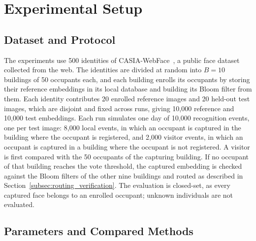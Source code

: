 \documentclass[pdflatex,sn-mathphys-num]{sn-jnl}%
\theoremstyle{thmstyleone}%
\theoremstyle{thmstyletwo}%
\theoremstyle{thmstylethree}%
\begin{document}

\section{Experimental Setup}
\label{sec:setup}

\subsection{Dataset and Protocol}

The experiments use 500 identities of CASIA-WebFace~\cite{yi2014}, a public face dataset collected from the web. The identities are divided at random into $B=10$ buildings of 50 occupants each, and each building enrolls its occupants by storing their reference embeddings in its local database and building its Bloom filter from them. Each identity contributes 20 enrolled reference images and 20 held-out test images, which are disjoint and fixed across runs, giving 10,000 reference and 10,000 test embeddings. Each run simulates one day of 10,000 recognition events, one per test image: 8,000 local events, in which an occupant is captured in the building where the occupant is registered, and 2,000 visitor events, in which an occupant is captured in a building where the occupant is not registered. A visitor is first compared with the 50 occupants of the capturing building. If no occupant of that building reaches the vote threshold, the captured embedding is checked against the Bloom filters of the other nine buildings and routed as described in Section~\ref{subsec:routing_verification}. The evaluation is closed-set, as every captured face belongs to an enrolled occupant; unknown individuals are not evaluated.

\subsection{Parameters and Compared Methods}
\end{document}
